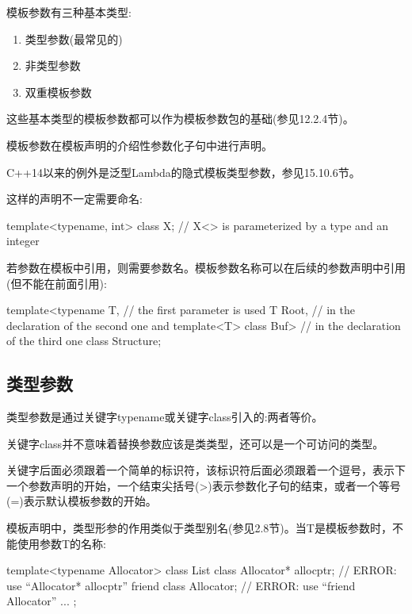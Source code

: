 
模板参数有三种基本类型:

\begin{enumerate}
\item 
类型参数(最常见的)

\item 
非类型参数

\item 
双重模板参数
\end{enumerate}	

这些基本类型的模板参数都可以作为模板参数包的基础(参见12.2.4节)。

模板参数在模板声明的介绍性参数化子句中进行声明。

\begin{notice}C++14以来的例外是泛型Lambda的隐式模板类型参数，参见15.10.6节。
\end{notice}

这样的声明不一定需要命名:

\begin{cpp}
template<typename, int>
class X; // X<> is parameterized by a type and an integer
\end{cpp}

若参数在模板中引用，则需要参数名。模板参数名称可以在后续的参数声明中引用(但不能在前面引用):

\begin{cpp}
template<typename T, // the first parameter is used
		T Root, // in the declaration of the second one and
		template<T> class Buf> // in the declaration of the third one
class Structure;
\end{cpp}

\subsection{类型参数}

类型参数是通过关键字typename或关键字class引入的:两者等价。

\begin{notice}关键字class并不意味着替换参数应该是类类型，还可以是一个可访问的类型。
\end{notice}

关键字后面必须跟着一个简单的标识符，该标识符后面必须跟着一个逗号，表示下一个参数声明的开始，一个结束尖括号(>)表示参数化子句的结束，或者一个等号(=)表示默认模板参数的开始。

模板声明中，类型形参的作用类似于类型别名(参见2.8节)。当T是模板参数时，不能使用参数T的名称:

\begin{cpp}
template<typename Allocator>
class List {
	class Allocator* allocptr; // ERROR: use “Allocator* allocptr”
	friend class Allocator; // ERROR: use “friend Allocator”
	...
};
\end{cpp}

